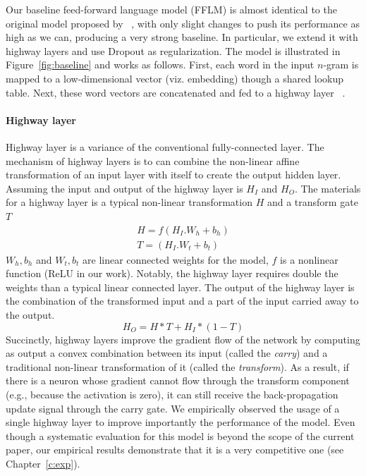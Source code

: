 Our baseline feed-forward language model (FFLM) is almost identical to the original model proposed by  ~, with only slight changes to push its performance as high as we can, producing a very strong baseline. In particular, we extend it with highway layers and use Dropout as regularization. The model is illustrated in Figure~\ref{fig:baseline} and works as follows. First, each word in the input $n$-gram is mapped to a low-dimensional vector (viz. embedding) though a shared lookup table. Next, these word vectors are concatenated and fed to a highway layer ~\cite{srivastava2015highway}.

\paragraph{Highway layer} Highway layer is a variance of the conventional fully-connected layer. The mechanism of highway layers is to can combine the non-linear affine transformation of an input layer with itself to create the output hidden layer. 
Assuming the input and output of the highway layer is $H_I$ and $H_O$. The materials for a highway layer is a typical non-linear transformation $H$ and a transform gate $T$
\begin{equation}
\begin{aligned}
H = f(H_I . W_h + b_h) \\
T = (H_I . W_t + b_t)
\end{aligned}  
\end{equation}
$W_h, b_h$ and $W_t, b_t$ are linear connected weights for the model, $f$ is a nonlinear function (ReLU in our work). Notably, the highway layer requires double the weights than a typical linear connected layer.
The output of the highway layer is the combination of the transformed input and a part of the input carried away to the output. 
\begin{equation}
 H_O = H \ast T + H_I \ast (1 - T)
\end{equation}
Succinctly, highway layers improve the gradient flow of the network by computing as output a convex combination between its input (called the \emph{carry}) and a traditional non-linear transformation of it (called the \emph{transform}).
As a result, if there is a neuron whose gradient cannot flow through the transform component (e.g., because the activation is zero), it can still receive the back-propagation update signal through the carry gate.  %
 We empirically observed the usage of a single highway layer to improve importantly the performance of the model. Even though a systematic evaluation for this model is beyond the scope of the current paper, our empirical results demonstrate that it is a very competitive one (see  Chapter~\ref{c:exp}).    
 
